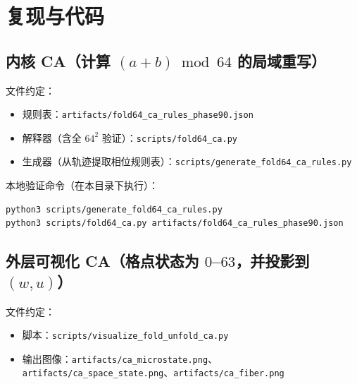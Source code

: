 
\section{复现与代码}

\subsection{内核 CA（计算 $(a+b)\bmod 64$ 的局域重写）}

文件约定：
\begin{itemize}
  \item 规则表：\verb|artifacts/fold64_ca_rules_phase90.json|
  \item 解释器（含全 $64^2$ 验证）：\verb|scripts/fold64_ca.py|
  \item 生成器（从轨迹提取相位规则表）：\verb|scripts/generate_fold64_ca_rules.py|
\end{itemize}

本地验证命令（在本目录下执行）：
\begin{verbatim}
python3 scripts/generate_fold64_ca_rules.py
python3 scripts/fold64_ca.py artifacts/fold64_ca_rules_phase90.json
\end{verbatim}

\subsection{外层可视化 CA（格点状态为 $0$--$63$，并投影到 $(w,u)$）}

文件约定：
\begin{itemize}
  \item 脚本：\verb|scripts/visualize_fold_unfold_ca.py|
  \item 输出图像：\verb|artifacts/ca_microstate.png|、\verb|artifacts/ca_space_state.png|、\verb|artifacts/ca_fiber.png|
\end{itemize}

